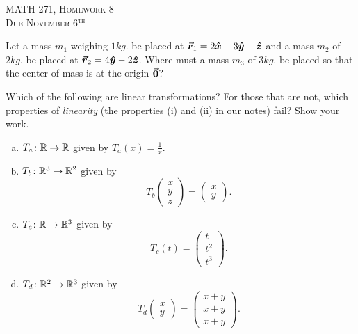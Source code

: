 \documentclass[12pt]{article} %
\begin{document}
\begin{center}
   \textsc{\large MATH 271, Homework 8}\\
   \textsc{Due November 6$^\textrm{th}$}
\end{center}
\vspace{.5cm}

\begin{problem}
Let a mass $m_1$ weighing $1kg.$ be placed at $\boldsymbol{\vec{r}}_1=2\boldsymbol{\hat{x}} -3 \boldsymbol{\hat{y}} -\boldsymbol{\hat{z}}$ and a mass $m_2$ of $2kg.$ be placed at $\boldsymbol{\vec{r}}_2 = 4\boldsymbol{\hat{y}} -2\boldsymbol{\hat{z}}$.  Where must a mass $m_3$ of $3kg.$ be placed so that the center of mass is at the origin $\boldsymbol{\vec{0}}$?
\end{problem}

\begin{problem}
Which of the following are linear transformations? For those that are not, which properties of \emph{linearity} (the properties (i) and (ii) in our notes) fail? Show your work. 
\begin{enumerate}[(a)]
    \item $T_a \colon \mathbb{R} \to \mathbb{R}$ given by $T_a(x)=\frac{1}{x}$.
    \item $T_b \colon \mathbb{R}^3 \to \mathbb{R}^2$ given by
    \[
    T_b \begin{pmatrix} x\\ y\\ z \end{pmatrix}
    = \begin{pmatrix} x\\ y \end{pmatrix}.
    \]
    \item $T_c \colon \mathbb{R} \to \mathbb{R}^3$ given by
    \[
    T_c(t)=\begin{pmatrix} t\\ t^2\\ t^3 \end{pmatrix}.
    \]
    \item $T_d \colon \mathbb{R}^2 \to \mathbb{R}^3$ given by
    \[
    T_d \begin{pmatrix} x\\ y \end{pmatrix}
    = \begin{pmatrix} x+y\\ x+y\\ x+y \end{pmatrix}.
    \]
\end{enumerate}
\end{problem}
\end{document}

